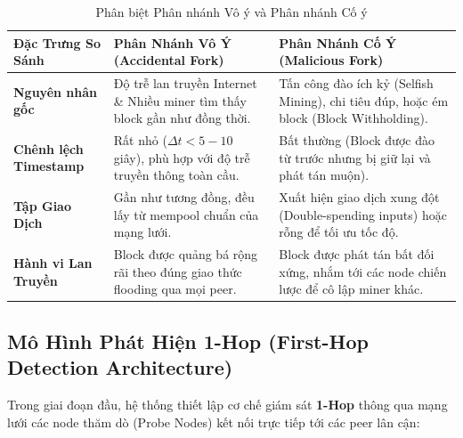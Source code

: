 \documentclass[11pt,a4paper]{article}
\begin{document}
\begin{table}[H]
\centering
\caption{Phân biệt Phân nhánh Vô ý và Phân nhánh Cố ý}
\label{tab:fork_classification}
\vspace{2mm}
\small
\begin{tabular}{p{3.5cm}p{5.5cm}p{5.5cm}}
\toprule
\textbf{Đặc Trưng So Sánh} & \textbf{Phân Nhánh Vô Ý (Accidental Fork)} & \textbf{Phân Nhánh Cố Ý (Malicious Fork)} \\
\midrule
\textbf{Nguyên nhân gốc} & Độ trễ lan truyền Internet \& Nhiều miner tìm thấy block gần như đồng thời. & Tấn công đào ích kỷ (Selfish Mining), chi tiêu đúp, hoặc ém block (Block Withholding). \\
\midrule
\textbf{Chênh lệch Timestamp} & Rất nhỏ ($\Delta t < 5 - 10$ giây), phù hợp với độ trễ truyền thông toàn cầu. & Bất thường (Block được đào từ trước nhưng bị giữ lại và phát tán muộn). \\
\midrule
\textbf{Tập Giao Dịch} & Gần như tương đồng, đều lấy từ mempool chuẩn của mạng lưới. & Xuất hiện giao dịch xung đột (Double-spending inputs) hoặc rỗng để tối ưu tốc độ. \\
\midrule
\textbf{Hành vi Lan Truyền} & Block được quảng bá rộng rãi theo đúng giao thức flooding qua mọi peer. & Block được phát tán bất đối xứng, nhắm tới các node chiến lược để cô lập miner khác. \\
\bottomrule
\end{tabular}
\end{table}

\subsection{Mô Hình Phát Hiện 1-Hop (First-Hop Detection Architecture)}
Trong giai đoạn đầu, hệ thống thiết lập cơ chế giám sát \textbf{1-Hop} thông qua mạng lưới các node thăm dò (Probe Nodes) kết nối trực tiếp tới các peer lân cận:
\end{document}
